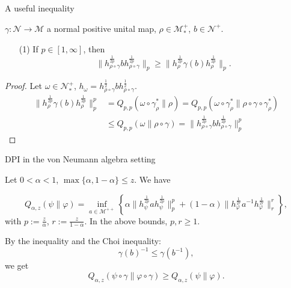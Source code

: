 \documentclass[mathserif]{beamer}
\newcommand{\<}{\langle}
\renewcommand{\>}{\rangle}
\newcommand{\Me}{\mathcal M}
\newcommand{\Ne}{\mathcal N}
\begin{document}
\begin{frame}{A useful inequality}

 $\gamma:\Ne\to \Me$  a normal positive unital map,  $\rho\in \Me_*^+$,  $b\in \Ne^+$. 

\bigskip
\begin{enumerate}
\item[(1)] If $p\in [1,\infty]$, then 
\[
\Big\|h_{\rho\circ\gamma}^{\frac{1}{2p}}bh_{\rho\circ\gamma}^{\frac{1}{2p}}\Big\|_p\ge
\Big\|h_{\rho}^{\frac{1}{2p}}\gamma(b)h_{\rho}^{\frac{1}{2p}}\Big\|_p.
\]
\end{enumerate}

\begin{proof} Let $\omega\in \Ne_*^+$,
$h_\omega=h_{\rho\circ\gamma}^{\frac12}bh_{\rho\circ\gamma}^{\frac12}$.
\begin{align*}
\Big\|h_{\rho}^{\frac{1}{2p}}\gamma(b)h_{\rho}^{\frac{1}{2p}}\Big\|^p_p&=Q_{p,p}(\omega\circ
\gamma^*_\rho\|\rho)=Q_{p,p}(\omega\circ
\gamma^*_\rho\|\rho\circ\gamma\circ\gamma_\rho^*)\\
&\le 
Q_{p,p}(\omega\|\rho\circ\gamma)=\Big\|h_{\rho\circ\gamma}^{\frac{1}{2p}}bh_{\rho\circ\gamma}^{\frac{1}{2p}}\Big\|^p_p
\end{align*}



\end{proof}

\end{frame}

\begin{frame}{DPI in the von Neumann algebra setting}

Let $0<\alpha<1$, $\max\{\alpha,1-\alpha\}\le z$.  We have

\medskip 

\[
Q_{\alpha,z}(\psi\|\varphi)=\inf_{a\in \Me^{++}}\left\{\alpha
\Big\|h_\psi^{\frac{1}{2p}}ah_\psi^{\frac{1}{2p}}\Big\|_p^{p}
+(1-\alpha) \Big\|h_\varphi^{\frac{1}{2r}}a^{-1}h_\varphi^{\frac{1}{2r}}\Big\|_r^{r}
\right\},
\]
with $p:=\frac{z}{\alpha}$, $r:=\frac{z}{1-\alpha}$. In the above bounds, $p,r\ge 1$.

\bigskip

By the inequality  and the Choi inequality:
\[
\gamma(b)^{-1}\le \gamma(b^{-1}),
\]
we get
\[
Q_{\alpha,z}(\psi\circ\gamma\|\varphi\circ\gamma)\ge Q_{\alpha,z}(\psi\|\varphi).
\]


\end{frame}
\end{document}
